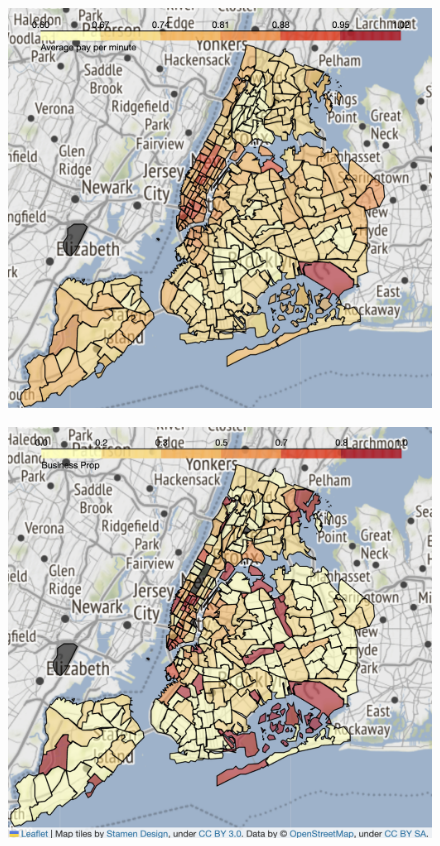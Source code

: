 \documentclass[11pt]{article}
\begin{document}
\begin{figure}[h]
\centering
    \begin{minipage}{.5\textwidth}
        \centering
        \includegraphics[width=.8\linewidth]{plots/Avg_ppmin_at8.png}
        \label{avg_ppmin_at8}
    \end{minipage}%
    \begin{minipage}{.5\textwidth}
        \centering
        \includegraphics[width=.8\linewidth]{plots/Prop_business.png}
        \label{Prop_business}
    \end{minipage}
\end{figure}
\end{document}
